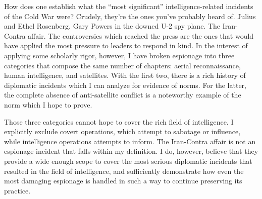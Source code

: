 \documentclass{report}
\begin{document}
\begin{refsegment}
How does one establish what the ``most significant'' intelligence-related incidents of the Cold War were? Crudely, they're the ones you've probably heard of. Julius and Ethel Rosenberg. Gary Powers in the downed U-2 spy plane. The Iran-Contra affair. The controversies which reached the press are the ones that would have applied the most pressure to leaders to respond in kind. In the interest of applying some scholarly rigor, however, I have broken espionage into three categories that compose the same number of chapters: aerial reconnaissance, human intelligence, and satellites. With the first two, there is a rich history of diplomatic incidents which I can analyze for evidence of norms. For the latter, the complete absence of anti-satellite conflict is a noteworthy example of the norm which I hope to prove.

Those three categories cannot hope to cover the rich field of intelligence. I explicitly exclude covert operations, which attempt to sabotage or influence, while intelligence operations attempts to inform. The Iran-Contra affair is not an espionage incident that falls within my definition. I do, however, believe that they provide a wide enough scope to cover the most serious diplomatic incidents that resulted in the field of intelligence, and sufficiently demonstrate how even the most damaging espionage is handled in such a way to continue preserving its practice.





\end{refsegment}
\end{document}
